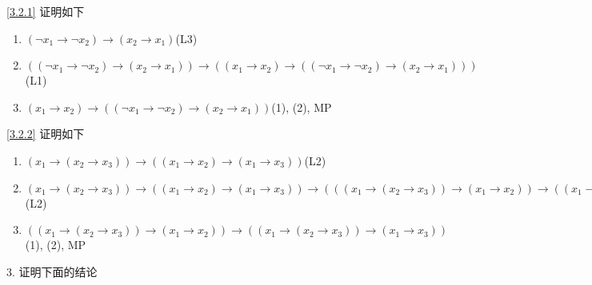 \documentclass[boxes]{homework}
\begin{document}
\begin{solution}
    \ref{3.2.1} 证明如下
    \begin{enumerate}[label = (\arabic*), itemsep = 0em, topsep = .5em, partopsep = .5em]
        \item $(\lnot x_1\to \lnot x_2)\to (x_2\to x_1)$\hfill (L3)
        \item $((\lnot x_1\to \lnot x_2)\to (x_2\to x_1))\to ((x_1\to x_2)\to ((\lnot x_1\to \lnot x_2)\to (x_2\to x_1)))$ \hfill (L1)
        \item $(x_1\to x_2)\to ((\lnot x_1\to \lnot x_2)\to (x_2\to x_1))$\hfill (1), (2), MP
    \end{enumerate}
    \ref{3.2.2} 证明如下
    \begin{enumerate}[label = (\arabic*), itemsep = 0em, topsep = .5em, partopsep = .5em]
        \item $(x_1\to (x_2\to x_3))\to ((x_1\to x_2)\to (x_1\to x_3))$\hfill (L2)
        \item $(x_1\to (x_2\to x_3))\to ((x_1\to x_2)\to (x_1\to x_3))\to (((x_1\to (x_2\to x_3))\to (x_1\to x_2))\to ((x_1\to (x_2\to x_3))\to (x_1\to x_3)))$\hfill (L2)
        \item $((x_1\to (x_2\to x_3))\to (x_1\to x_2))\to ((x_1\to (x_2\to x_3))\to (x_1\to x_3))$\hfill (1), (2), MP
    \end{enumerate}
\end{solution}
\begin{problem}
3. 证明下面的结论
\end{problem}
\end{document}
